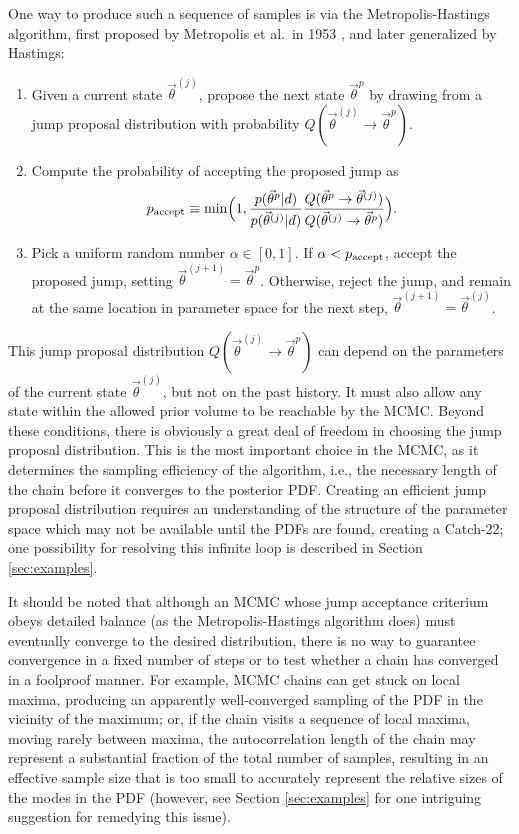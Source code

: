 \documentclass[prd,preprint]{revtex4}
\newcommand{\vtheta}{\vec{\theta}}
\newcommand{\ee}{\end{equation}}
\newcommand{\bel}[1]{\begin{equation}\label{#1}}
\begin{document}
One way to produce such a sequence of samples is via the Metropolis-Hastings algorithm, first proposed by Metropolis et al.~in 1953 \cite{Metropolis:1953}, and later generalized by Hastings:
\begin{enumerate}
  \item Given a current state $\vtheta^{(j)}$, propose the next state $\vtheta^p$ by drawing from a jump proposal distribution with probability $Q(\vtheta^{(j)} \to \vtheta^p)$.  
  \item Compute the probability of accepting the proposed jump as
\bel{eq:p-accept}
p_{\textnormal{accept}}  \equiv \min\Bigl(1,  \frac{p(\vtheta^p|d)}{p(\vtheta^{(j)}|d)} \frac{Q(\vtheta^p \to
        \vtheta^{(j)})}{Q(\vtheta^{(j)} \to \vtheta^p)} \Bigr).
\ee
\item Pick a uniform random number $\alpha \in [0,1]$.  If $\alpha<  p_{\textnormal{accept}}$, accept the proposed jump, setting $\vtheta^{(j+1)}=\vtheta^p$.  Otherwise, reject the jump, and remain at the same location in parameter space for the next step, $\vtheta^{(j+1)}=\vtheta^{(j)}$.
 \end{enumerate}
 
This jump proposal distribution $Q(\vtheta^{(j)} \to \vtheta^p)$ can depend on the parameters of the current state $\vtheta^{(j)}$, but not on the past history.  It must also allow any state within the allowed prior volume to be reachable by the MCMC.  Beyond these conditions, there is obviously a great deal of freedom in choosing the jump proposal distribution.  This is the most important choice in the MCMC, as it determines the sampling efficiency of the algorithm, i.e., the necessary length of the chain before it converges to the posterior PDF.  Creating an efficient jump proposal distribution requires an understanding of the structure of the parameter space which may not be available until the PDFs are found, creating a Catch-22; one possibility for resolving this infinite loop is described in Section \ref{sec:examples}.

It should be noted that although an MCMC whose jump acceptance
criterium obeys detailed balance (as the Metropolis-Hastings algorithm
does) must eventually converge to the desired distribution, there is
no way to guarantee convergence in a fixed number of steps or to test
whether a chain has converged in a foolproof manner.  For example,
MCMC chains can get stuck on local maxima, producing an apparently
well-converged sampling of the PDF in the vicinity of the maximum; or,
if the chain visits a sequence of local maxima, moving rarely between
maxima, the autocorrelation length of the chain may represent a
substantial fraction of the total number of samples, resulting in an
effective sample size that is too small to accurately represent the
relative sizes of the modes in the PDF (however, see Section
\ref{sec:examples} for one intriguing suggestion for remedying this
issue).
\end{document}
